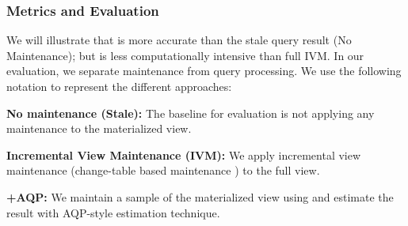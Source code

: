 \subsubsection{Metrics and Evaluation}
We will illustrate that \svc is more accurate than the stale query result (No Maintenance); but is less computationally intensive than full IVM. 
In our evaluation, we separate maintenance from query processing.
We use the following notation to represent the different approaches:

\noindent\textbf{No maintenance (Stale): } The baseline for evaluation is not applying any maintenance to the materialized view.

\noindent\textbf{Incremental View Maintenance (IVM): } We apply incremental view maintenance (change-table based maintenance \cite{gupta1995maintenance,gupta2006incremental, DBLP:journals/vldb/KochAKNNLS14}) to the full view.

\noindent\textbf{\svcnospace+AQP: } We maintain a sample of the materialized view using \svc and estimate the result with AQP-style estimation technique. 

